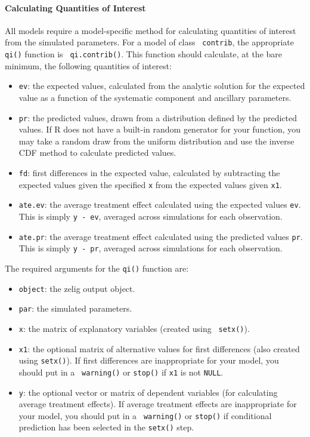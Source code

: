 \paragraph{Calculating Quantities of Interest}

All models require a model-specific method for calculating quantities
of interest from the simulated parameters.  For a model of class {\tt
  contrib}, the appropriate {\tt qi()} function is {\tt
  qi.contrib()}.  This function should calculate, at the bare minimum,
the following quantities of interest:

\begin{itemize}
\item {\tt ev}:  the expected values, calculated from the analytic
  solution for the expected value as a function of the systematic
  component and ancillary parameters.  
\item {\tt pr}:  the predicted values, drawn from a distribution
  defined by the predicted values.  If R does not have a built-in
  random generator for your function, you may take a random draw from
  the uniform distribution and use the inverse CDF method to calculate
  predicted values.  
\item {\tt fd}: first differences in the expected value, calculated
  by subtracting the expected values given the specified {\tt x} from
  the expected values given {\tt x1}.   
\item {\tt ate.ev}: the average treatment effect calculated using the
  expected values {\tt ev}.  This is simply {\tt y - ev}, averaged across
  simulations for each observation.  
\item {\tt ate.pr}:  the average treatment effect calculated using
  the predicted values {\tt pr}.  This is simply {\tt y - pr},
  averaged across simulations for each observation.   
\end{itemize}
The required arguments for the {\tt qi()} function are:  
\begin{itemize}
\item {\tt object}: the zelig output object.
\item {\tt par}: the simulated parameters. 
\item {\tt x}: the matrix of explanatory variables (created using {\tt
    setx()}).
\item {\tt x1}: the optional matrix of alternative values for first
  differences (also created using {\tt setx()}).  If first differences
  are inappropriate for your model, you should put in a {\tt
    warning()} or {\tt stop()} if {\tt x1} is not {\tt NULL}.  
\item {\tt y}: the optional vector or matrix of dependent variables
  (for calculating average treatment effects).  If average treatment
  effects are inappropriate for your model, you should put in a {\tt
    warning()} or {\tt stop()} if conditional prediction has been
  selected in the {\tt setx()} step.  
\end{itemize}

